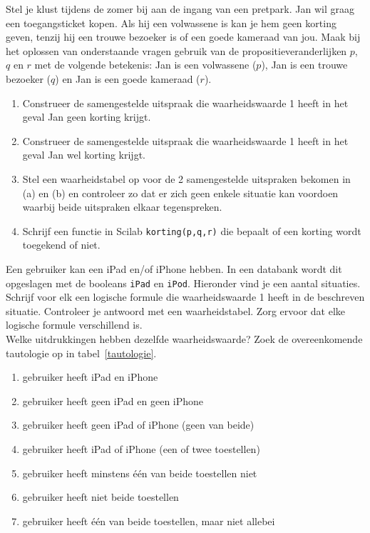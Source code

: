 \begin{oef}
 Stel je klust tijdens de zomer bij aan de ingang van een pretpark. Jan wil graag een toegangsticket kopen. Als hij een volwassene is kan je hem geen korting geven, tenzij hij een trouwe bezoeker is of een goede kameraad van jou. Maak bij het oplossen van onderstaande vragen gebruik van de propositieveranderlijken $p$, $q$ en $r$ met de volgende betekenis: Jan is een volwassene ($p$), Jan is een trouwe bezoeker ($q$) en Jan is een goede kameraad ($r$).
\begin{enumerate}
\item Construeer de samengestelde uitspraak die waarheidswaarde 1 heeft in het geval Jan geen korting krijgt.
\item  Construeer de samengestelde uitspraak die waarheidswaarde 1 heeft in het geval Jan wel korting krijgt.
\item  Stel een waarheidstabel op voor de 2 samengestelde uitspraken bekomen in (a) en (b) en controleer zo dat er zich geen enkele situatie kan voordoen waarbij beide uitspraken elkaar tegenspreken.
\item  Schrijf een functie in Scilab \verb+korting(p,q,r)+ die bepaalt of een korting wordt toegekend of niet.
\end{enumerate}

\end{oef}

\begin{oef}
 Een gebruiker kan een iPad en/of iPhone hebben. In een databank wordt dit opgeslagen met de booleans \verb+iPad+ en \verb+iPod+. Hieronder vind je een aantal situaties. Schrijf voor elk een logische formule die waarheidswaarde 1 heeft in de beschreven situatie. Controleer je antwoord met een waarheidstabel. Zorg ervoor dat elke logische formule verschillend is.
\\ Welke uitdrukkingen hebben dezelfde waarheidswaarde? Zoek de overeenkomende tautologie op in tabel~\ref{tautologie}.
\begin{enumerate}
\item  gebruiker heeft  iPad en iPhone
\item  gebruiker heeft geen iPad en geen iPhone
\item gebruiker heeft geen iPad of iPhone (geen van beide)
\item gebruiker heeft iPad of iPhone  (een of twee toestellen) 
\item gebruiker heeft minstens \'e\'en van beide toestellen niet
\item gebruiker heeft niet beide toestellen
\item  gebruiker heeft \'e\'en van beide toestellen,  maar niet allebei 
\end{enumerate}


\end{oef}

